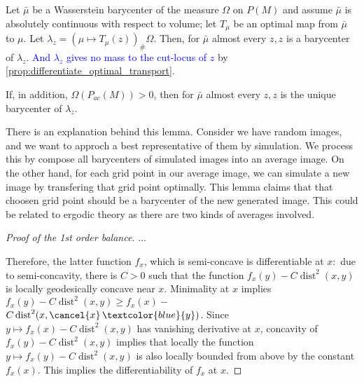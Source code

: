 \begin{lem} 
	\label{lem:inverse_barycenter}
	Let \( \bar { \mu } \) be a Wasserstein barycenter of the measure \( \Omega \) on \( P ( M ) \) and assume \( \bar { \mu } \) is absolutely continuous with respect to volume;
	let \( T _ { \mu } \) be an optimal map from \( \bar { \mu } \) to \( \mu . \)
	Let \( \lambda _ { z } = \left( \mu \mapsto T _ { \mu } ( z ) \right) _ { \# } \Omega . \)
	Then, for \( \bar { \mu } \) almost every \( z , z \) is a barycenter of \( \lambda _ { z }\).
	\textcolor{blue}{And $\lambda_z$ gives no mass to the cut-locus of $z$} by \cref{prop:differentiate_optimal_transport}.

	If, in addition, \( \Omega \left( P _ { a c } ( M ) \right) > 0 \), then for \( \bar { \mu } \) almost every \( z , z \) is the unique barycenter of $\lambda _ { z }$.

\end{lem}

There is an explanation behind this lemma. Consider we have random images, and we want to approch a best representative of them by simulation. We process this by compose all barycenters of simulated images into an average image. On the other hand, for each grid point in our average image, we can simulate a new image by transfering that grid point optimally. This lemma claims that that choosen grid point should be a barycenter of the new generated image. This could be related to ergodic theory as there are two kinds of averages involved.

\begin{proof}[Proof of the 1st order balance]
	...

	Therefore, the latter function \( f _ { x } \), which is semi-concave is differentiable at \( x : \) due to semi-concavity, there is \( C > 0 \) such that the function \( f _ { x } ( y ) - C \operatorname { dist } ^ { 2 } ( x , y ) \) is locally geodesically concave near \( x \).
	Minimality at \( x \) implies \( f _ { x } ( y ) - C \operatorname { dist } ^ { 2 } ( x , y ) \geq f _ { x } ( x ) - \) \( C \operatorname { dist } ^ { 2 } ( x , \cancel{x}\, \textcolor{blue}{y} ) \).
	Since \( y \mapsto f _ { x } ( x ) - C \operatorname { dist } ^ { 2 } ( x , y ) \) has vanishing derivative at \( x \), concavity of \( f _ { x } ( y ) - C \operatorname { dist } ^ { 2 } ( x , y ) \) implies that locally the function \( y \mapsto f _ { x } ( y ) - C \operatorname { dist } ^ { 2 } ( x , y ) \) is also
	locally bounded from above by the constant \( f _ { x } ( x ) . \) This implies the differentiability of
	\( f _ { x } \) at \( x \).
\end{proof}

